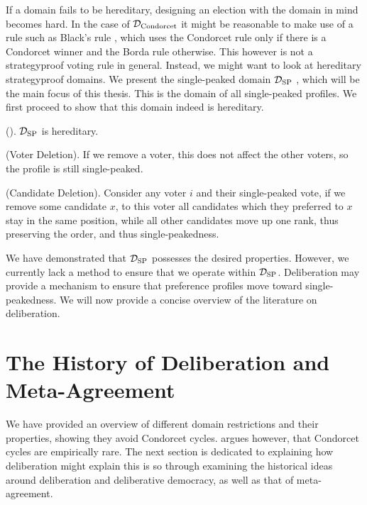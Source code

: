 If a domain fails to be hereditary, designing an election with the domain in
mind becomes hard. In the case of $\mathcal{D}_{\textnormal{Condorcet}}$ it might be reasonable
to make use of a rule such as Black's rule
\cite{blackRationaleGroupDecisionmaking1948}, which uses the Condorcet rule
only if there is a Condorcet winner and the Borda rule otherwise. This however
is not a strategyproof voting rule in general. Instead, we might want to look
at hereditary strategyproof domains. We present the single-peaked domain $\mathcal{D}_{\textnormal{SP}}$ , which
will be the main focus of this thesis. This is the domain of all single-peaked
profiles. We first proceed to show that this domain indeed is hereditary.


\begin{proposition}{\textnormal{(\citet{elkindPreferenceRestrictionsComputational2022}).}}
	$\mathcal{D}_{\textnormal{SP}}$ is hereditary.
\end{proposition}

\begin{proofc}
	(Voter Deletion). If we remove a voter, this does not affect the other voters, so the profile is still single-peaked.~\checkmark

	(Candidate Deletion). Consider any voter $i$ and their single-peaked
	vote, if we remove some candidate $x$, to this voter all candidates which they preferred to $x$ stay in the same position, while all other candidates move
	up one rank, thus preserving the order, and thus single-peakedness.~\checkmark
\end{proofc}


We have demonstrated that $\mathcal{D}_{\textnormal{SP}}$ possesses the desired properties.
However, we currently lack a method to ensure that we operate within
$\mathcal{D}_{\textnormal{SP}}$. Deliberation may provide a mechanism to ensure that preference
profiles move toward single-peakedness. We will now provide a concise
overview of the literature on deliberation.

\section{The History of Deliberation and Meta-Agreement}

We have provided an overview of different domain restrictions and their
properties, showing they avoid Condorcet cycles.
\citet{bochslerMarquisCondorcetGoes2010} argues however, that Condorcet cycles
are empirically rare. The next section is dedicated to explaining how
deliberation might explain this is so through examining the historical ideas
around deliberation and deliberative democracy, as well as that of
meta-agreement.

